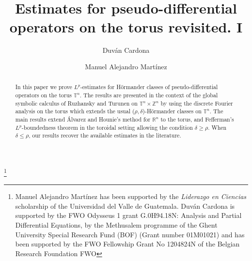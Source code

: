\documentclass[12pt, reqno]{amsart}
\theoremstyle{definition}
\theoremstyle{remark}
\numberwithin{equation}{section}
\begin{document}
\setcounter{page}{1}

\title[Estimates for operators on the torus. I]{ Estimates for pseudo-differential operators on the torus revisited. I}


\author[D. Cardona]{Duv\'an Cardona}
\address{
  Duv\'an Cardona:
  \endgraf
  Department of Mathematics: Analysis, Logic and Discrete Mathematics
  \endgraf
  Ghent University, Belgium
  \endgraf
  {\it E-mail address} {\rm duvanc306@gmail.com, duvan.cardonasanchez@ugent.be}
  }



\author[M. A. Mart\'inez]{Manuel Alejandro Mart\'inez}
\address{
  Manuel Alejandro Mart\'inez
  \endgraf
  Department of Mathematics
  \endgraf
 Universidad del Valle de Guatemala, Guatemala
  \endgraf
  {\it E-mail address} {\rm mar21403@uvg.edu.gt, manuelalejandromartinezf@gmail.com}
  } 




  
  




\thanks{ Manuel Alejandro Mart\'inez has been supported by the {\it{Liderazgo en Ciencias}} scholarship of the Universidad del Valle de Guatemala.  Duv\'an Cardona is supported  by the FWO  Odysseus  1  grant  G.0H94.18N:  Analysis  and  Partial Differential Equations, by the Methusalem programme of the Ghent University Special Research Fund (BOF)
(Grant number 01M01021) and has been supported by the FWO Fellowship
Grant No 1204824N of the Belgian Research Foundation FWO}


\begin{abstract}
In this paper we prove $L^p$-estimates for H\"ormander classes of pseudo-differential operators on the torus $\mathbb{T}^n$. The results are presented in the context of the global symbolic calculus of Ruzhansky and Turunen on $\mathbb{T}^n\times\mathbb{Z}^n$ by using the discrete Fourier analysis on the torus which extends the usual ($\rho,\delta$)-Hörmander classes on $\mathbb{T}^n$. The main results extend \'Alvarez and Hounie's method for $\mathbb{R}^n$ to the torus, and Fefferman's $L^p$-boundedness theorem in the toroidal setting allowing the condition $\delta\geq\rho$. When $\delta \leq \rho$, our results recover the available estimates in the literature.
\end{abstract} 
\end{document}
